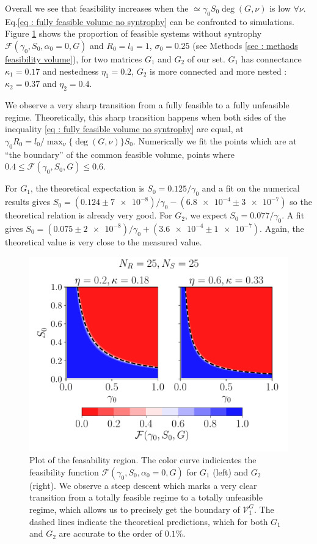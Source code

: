 \documentclass[12pt, titlepage]{report}
\begin{document}
Overall we see that feasibility increases when the  $\simeq \gamma_0 S_0 \deg(G,\nu) $ is low $\forall \nu$.
Eq.\eqref{eq : fully feasible volume no syntrophy} can be confronted to simulations. Figure \ref{fig : typical feasibility region} shows the proportion of feasible systems without syntrophy $\mathcal{F}(\gamma_0, S_0, \alpha_0=0, G)$ and $R_0=l_0=1$, $\sigma_0=0.25$ (see Methods \ref{sec : methods feasibility volume}), for two matrices $G_1$ and $G_2$ of our set. $G_1$ has connectance $\kappa_1=0.17$ and nestedness $\eta_1=0.2$, $G_2$ is more connected and more nested : $\kappa_2=0.37$ and $\eta_2=0.4$.

We observe a very sharp transition from a fully feasible to a fully unfeasible regime. Theoretically, this sharp transition happens when both sides of the inequality \eqref{eq : fully feasible volume no syntrophy} are equal, \ie at $\gamma_0 R_0 = l_0/\max_\nu\{\deg(G,\nu)\}S_0$.
 Numerically we fit the points which are at ``the boundary'' of the common feasible volume, \ie points where $0.4 \leq \mathcal{F}(\gamma_0, S_0, G) \leq 0.6$.

 For $G_1$, the theoretical expectation is $S_0 = 0.125/ \gamma_0$ and a fit on the numerical results gives $S_0=(\num[scientific-notation=false]{0.124}\pm\num{7e-8})/ \gamma_0 - (\num{6.8e-4}\pm\num{3e-7})$ so the theoretical relation is already very good.
For $G_2$, we expect $S_0 = 0.077 /\gamma_0$. A fit gives $S_0=(\num[scientific-notation=false]{0.075}\pm\num{2e-8})/\gamma_0 +(\num{3.6e-4}\pm\num{1e-7})$. Again, the theoretical value is very close to the measured value.
\begin{figure}[h!]
\centering
\includegraphics[width=0.7\linewidth]{Results/typical_feasibility_volume}
\caption{Plot of the feasability region. The color curve indicicates the feasibility function $\mathcal{F}(\gamma_0, S_0, \alpha_0=0, G)$ for $G_1$ (left) and $G_2$ (right). We observe a steep descent which marks a very clear transition from a totally feasible regime to a totally unfeasible regime, which allows us to precisely get the boundary of $\mathcal{V}^{G}_1$. The dashed lines indicate the theoretical predictions, which for both $G_1$ and $G_2$ are accurate to the order of $0.1 \%$.}
\label{fig : typical feasibility region}
\end{figure}
\end{document}
